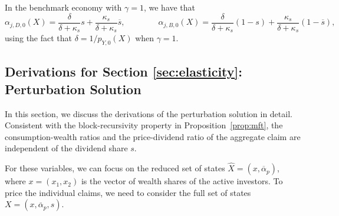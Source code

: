 In the benchmark economy with $\gamma = 1$, we have that 
\begin{equation}
    \alpha_{j,D,0}(X) = \frac{\delta}{\delta + \kappa_s} s + \frac{\kappa_s}{\delta + \kappa_s} \overline{s}, \qquad \qquad 
    \alpha_{j,B,0}(X) = \frac{\delta}{\delta + \kappa_s} (1-s) + \frac{\kappa_s}{\delta + \kappa_s} (1-\overline{s}),
\end{equation}
using the fact that $\delta = 1/p_{Y,0}(X)$ when $\gamma = 1$.



\subsection{Derivations for Section \ref{sec:elasticity}: Perturbation Solution}\label{app:derivations-perturbation-solution}

In this section, we discuss the derivations of the perturbation solution in detail. 
Consistent with the block-recursivity property in Proposition~\ref{prop:mft}, the consumption-wealth ratios and the price-dividend ratio of the aggregate claim are independent of the dividend share $s$.

For these variables, we can focus on the reduced set of states $\hat{X} = (x, \overline{\alpha}_{p})$, where $x = (x_1, x_2)$ is the vector of wealth shares of the active investors. 
To price the individual claims, we need to consider the full set of states $X = (x, \overline{\alpha}_{p}, s)$.

